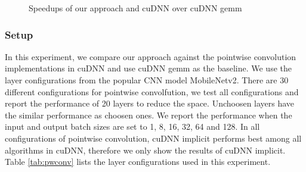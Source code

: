 \begin{figure}
\centering
	
\vspace{-2mm}
\caption{Speedups of our approach and cuDNN over cuDNN gemm} \label{fig:pwexectime}
\vspace{-5mm}
\end{figure}


\subsubsection{Setup} In this experiment, we compare our approach against the pointwise convolution implementations in cuDNN and use cuDNN gemm as the baseline. 
We use the layer configurations from the popular CNN model MobileNetv2.
There are 30 different configurations for pointwise convolfution, we test all configurations and report the performance of 20 layers to reduce the space. Unchoosen layers have the similar performance as choosen ones.  
We report the performance when the input and output batch sizes are set to 1, 8, 16, 32, 64 and 128.
In all configurations of pointwise convolution, cuDNN implicit performs best among all algorithms in cuDNN, therefore we only show the results of cuDNN implicit.
Table \ref{tab:pwconv} lists the layer configurations used in this experiment.

